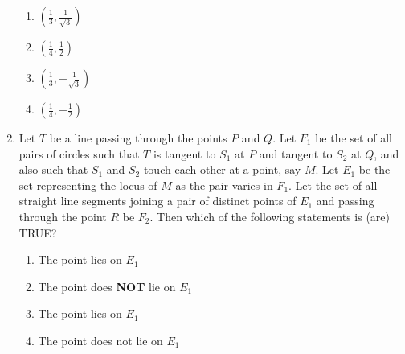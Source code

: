 \documentclass[journal,12pt,twocolumn]{IEEEtran}
\theoremstyle{remark}
\begin{document}
\begin{enumerate}
\hfill {}
\begin{enumerate}[label=(\alph*)]
\item $\left(\frac{1}{3}, \frac{1}{\sqrt{3}}\right)$
\item $\left(\frac{1}{4}, \frac{1}{2} \right)$
\item $\left(\frac{1}{3}, -\frac{1}{\sqrt{3}} \right)$
\item $\left(\frac{1}{4}, -\frac{1}{2}\right)$
\end{enumerate}
\item Let \textit{$T$} be a line passing through the points \textit{$P$} and \textit{$Q$}. Let \textit{$F_1$} be the set of all pairs of circles  such that \textit{$T$} is tangent to \textit{$S_1$} at \textit{$P$} and tangent to \textit{$S_2$} at \textit{$Q$}, and also such that \textit{$S_1$} and \textit{$S_2$} touch each other at a point, say \textit{$M$}. Let \textit{$E_1$} be the set representing the locus of \textit{$M$} as the pair  varies in \textit{$F_1$}. Let the set of all straight line segments joining a pair of distinct points of \textit{$E_1$} and passing through the point \textit{$R$} be \textit{$F_2$}. Then which of the following statements is (are) TRUE?

\hfill{}
\begin{enumerate}
\item The point  lies on \textit{$E_1$}
\item The point  does \textbf{NOT} lie on \textit{$E_1$}
\item The point  lies on \textit{$E_1$}
\item The point  does not lie on \textit{$E_1$}
\end{enumerate}
\end{enumerate}
\end{document}
